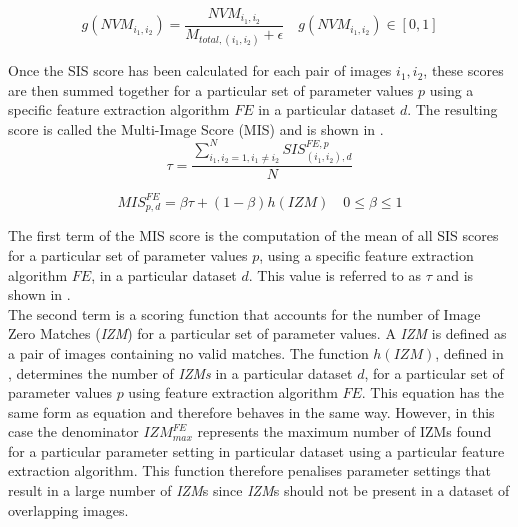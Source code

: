 \documentclass{report}
\begin{document}
\begin{equation}
g(NVM_{i_1, i_2}) = \frac{NVM_{i_1, i_2}}{M_{total, (i_1, i_2)} + \epsilon} \quad g(NVM_{i_1, i_2}) \in [0, 1] %
\label{eqn:nvm}
\end{equation}

Once the SIS score has been calculated for each pair of images $i_1, i_2$, these scores are then summed together for a particular set of parameter values $p$ using a specific feature extraction algorithm $FE$ in a particular dataset $d$. The resulting score is called the Multi-Image Score (MIS) and is shown in .\\

\begin{equation}
\tau = \frac{\sum_{i_1, i_2=1 , i_1 \neq i_2}^{N} \textit{SIS}_{(i_1, i_2),d}^{FE,p}}{N}
\label{eqn:tau}
\end{equation}

\begin{equation}
MIS_{p, d}^{FE} = \beta \tau + (1-\beta) h(\textit{IZM}) \quad 0 \leq \beta \leq 1
\label{eqn:mims}
\end{equation}

The first term of the MIS score is the computation of the mean of all SIS scores for a particular set of parameter values $p$, using a specific feature extraction algorithm $FE$, in a particular dataset $d$. This value is referred to as $\tau$ and is shown in .\\

The second term is a scoring function that accounts for the number of Image Zero Matches (\textit{IZM}) for a particular set of parameter values. A \textit{IZM} is defined as a pair of images containing no valid matches. The function $h(IZM)$, defined in , determines the number of \textit{IZMs} in a particular dataset $d$, for a particular set of parameter values $p$ using feature extraction algorithm $FE$. This equation has the same form as equation  and therefore behaves in the same way. However, in this case the denominator $\textit{IZM}_{max}^{FE}$ represents the maximum number of IZMs found for a particular parameter setting in particular dataset using a particular feature extraction algorithm. This function therefore penalises parameter settings that result in a large number of \textit{IZM}s since \textit{IZM}s should not be present in a dataset of overlapping images. \\
\end{document}
